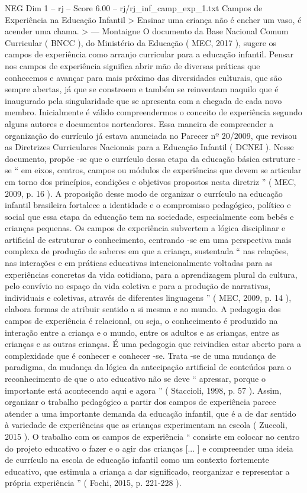\begin{textsample}{NEG Dim 1 – rj – Score 6.00 – rj/rj\_inf\_camp\_exp\_1.txt}  \label{ex:f1_neg_018}
Campos de Experiência na Educação Infantil > Ensinar uma criança não é encher um vaso, é acender uma chama. > — Montaigne O documento da Base Nacional Comum Curricular ( BNCC ), do Ministério da Educação ( MEC, 2017 ), sugere os campos de experiência como arranjo curricular para a educação infantil.
Pensar nos campos de experiência significa abrir mão de diversas práticas que conhecemos e avançar para mais próximo das diversidades culturais, que são sempre abertas, já que se constroem e também se reinventam naquilo que é inaugurado pela singularidade que se apresenta com a chegada de cada novo membro.
Inicialmente é válido compreendermos o conceito de experiência segundo alguns autores e documentos norteadores.
Essa maneira de compreender a organização do currículo já estava anunciada no Parecer nº 20/2009, que revisou as Diretrizes Curriculares Nacionais para a Educação Infantil ( DCNEI ).
Nesse documento, propõe -se que o currículo dessa etapa da educação básica estruture -se “ em eixos, centros, campos ou módulos de experiências que devem se articular em torno dos princípios, condições e objetivos propostos nesta diretriz ” ( MEC, 2009, p. 16 ).
A proposição desse modo de organizar o currículo na educação infantil brasileira fortalece a identidade e o compromisso pedagógico, político e social que essa etapa da educação tem na sociedade, especialmente com bebês e crianças pequenas.
Os campos de experiência subvertem a lógica disciplinar e artificial de estruturar o conhecimento, centrando -se em uma perspectiva mais complexa de produção de saberes em que a criança, sustentada “ nas relações, nas interações e em práticas educativas intencionalmente voltadas para as experiências concretas da vida cotidiana, para a aprendizagem plural da cultura, pelo convívio no espaço da vida coletiva e para a produção de narrativas, individuais e coletivas, através de diferentes linguagens ” ( MEC, 2009, p. 14 ), elabora formas de atribuir sentido a si mesma e ao mundo.
A pedagogia dos campos de experiência é relacional, ou seja, o conhecimento é produzido na interação entre a criança e o mundo, entre os adultos e as crianças, entre as crianças e as outras crianças.
É uma pedagogia que reivindica estar aberto para a complexidade que é conhecer e conhecer -se.
Trata -se de uma mudança de paradigma, da mudança da lógica da antecipação artificial de conteúdos para o reconhecimento de que o ato educativo não se deve “ apressar, porque o importante está acontecendo aqui e agora ” ( Staccioli, 1998, p. 57 ).
Assim, organizar o trabalho pedagógico a partir dos campos de experiência parece atender a uma importante demanda da educação infantil, que é a de dar sentido à variedade de experiências que as crianças experimentam na escola ( Zuccoli, 2015 ).
O trabalho com os campos de experiência “ consiste em colocar no centro do projeto educativo o fazer e o agir das crianças [... ] e compreender uma ideia de currículo na escola de educação infantil como um contexto fortemente educativo, que estimula a criança a dar significado, reorganizar e representar a própria experiência ” ( Fochi, 2015, p. 221-228 ).

\end{textsample}
